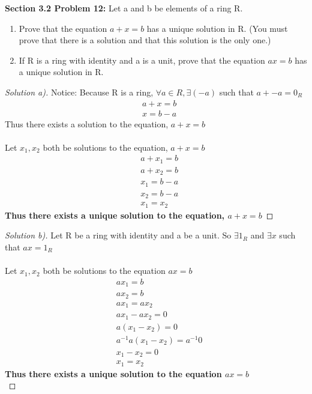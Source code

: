 \documentclass[12pt]{article}
\begin{document}
\noindent \textbf{Section 3.2 Problem 12: } Let a and b be elements of a ring R.
\begin{enumerate}[label = (\alph*)]
	\item Prove that the equation $a + x = b$ has a unique solution in R. (You must prove that there is a solution and that this solution is the only one.)
	\item If R is a ring with identity and a is a unit, prove that the equation $ax = b$ has a unique solution in R. 
\end{enumerate}
\vspace{\baselineskip}
\begin{proof}[Solution a)]
Notice: Because R is a ring, $\forall a \in R, \exists (-a)$ such that $a + -a = 0_R$ 
	\begin{align*}
		&a + x = b \\
		&x = b - a
	\end{align*}
Thus there exists a solution to the equation, $a + x = b$ \\ \\
Let $x_1, x_2$ both be solutions to the equation, $a + x = b$
	\begin{align*}
		&a + x_1 = b \\
		&a + x_2 = b \\
		&x_1 = b - a \\
		&x_2 = b - a \\
		&x_1 = x_2
	\end{align*}
\textbf{\boldmath Thus there exists a unique solution to the equation, $a + x = b$}
\end{proof}
\vspace{\baselineskip}
\begin{proof}[Solution b)]
Let R be a ring with identity and a be a unit. So $\exists 1_R$ and $\exists x $ such that $ax = 1_R$ \\ \\
Let $x_1, x_2$ both be solutions to the equation $ax = b$
	\begin{align*}
		&ax_1 = b \\
		&ax_2 = b \\
		&ax_1 = ax_2 \\
		&ax_1 - ax_2 = 0 \\
		&a(x_1 - x_2) = 0 \\
		&a^{-1}a(x_1 - x_2) = a^{-1}0 \\
		&x_1 - x_2 = 0 \\
		&x_1 = x_2 
	\end{align*}
\textbf{\boldmath Thus there exists a unique solution to the equation $ax = b$ \\}
\end{proof}
\end{document}
